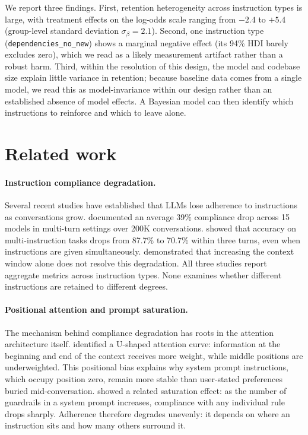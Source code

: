 \documentclass{llncs}
\begin{document}
We report three findings. First, retention heterogeneity across
instruction types is large, with treatment effects on the log-odds scale
ranging from $-2.4$ to $+5.4$ (group-level standard deviation
$\sigma_\beta = 2.1$). Second, one instruction type
(\texttt{dependencies\_no\_new}) shows a marginal negative effect (its
94\% HDI barely excludes zero), which we read as a likely measurement
artifact rather than a robust harm. Third, within the resolution of this design,
the model and codebase size explain little variance in retention;
because baseline data comes from a single model, we read this as
model-invariance within our design rather than an established absence of
model effects. A Bayesian model can then identify which instructions to
reinforce and which to leave alone.


\section{Related work}
\label{sec:related}

\paragraph{Instruction compliance degradation.}
Several recent studies have established that LLMs lose adherence to
instructions as conversations grow. \textcite{laban2025} documented an
average 39\% compliance drop across 15 models in multi-turn settings
over 200K conversations. \textcite{he2024} showed that accuracy on
multi-instruction tasks drops from 87.7\% to 70.7\% within three turns,
even when instructions are given simultaneously. \textcite{du2025}
demonstrated that increasing the context window alone does not resolve
this degradation. All three studies report aggregate metrics across
instruction types. None examines whether different instructions are retained
to different degrees.

\paragraph{Positional attention and prompt saturation.}
The mechanism behind compliance degradation has roots in the attention
architecture itself. \textcite{liu2024} identified a U-shaped attention
curve: information at the beginning and end of the context receives more
weight, while middle positions are underweighted. This positional bias
explains why system prompt instructions, which occupy position zero,
remain more stable than user-stated preferences buried mid-conversation.
\textcite{mu2025} showed a related saturation effect: as the number of
guardrails in a system prompt increases, compliance with any individual
rule drops sharply. Adherence therefore degrades unevenly: it depends on
where an instruction sits and how many others surround it.
\end{document}
